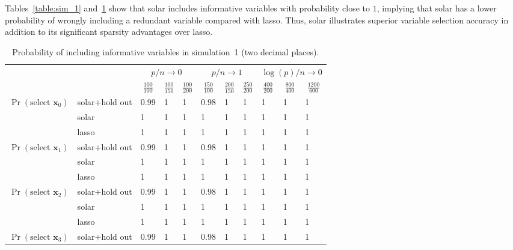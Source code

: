 \documentclass[12pt]{article}
\begin{document}
Tables~\ref{table:sim_1} and~\ref{table:sim_1_info} show that solar includes informative variables with probability close to $1$, implying that solar has a lower probability of wrongly including a redundant variable compared with lasso. Thus, solar illustrates superior variable selection accuracy in addition to its significant sparsity advantages over lasso.

\begin{table}[h]
  \centering
  \small
  \caption{Probability of including informative variables in simulation~1 (two decimal places).}
  \label{table:sim_1_info}
  \renewcommand{\arraystretch}{0.7}
  \begin{tabular}{lllllllllll}
    \toprule
         &
         & \multicolumn{3}{c}{$p/n\rightarrow0$}
         & \multicolumn{3}{c}{$p/n\rightarrow1$}
         & \multicolumn{3}{c}{$\log(p)/n\rightarrow0$} \\
    \cmidrule(r){3-5}\cmidrule(r){6-8}\cmidrule(l){9-11}
      &                           & \multicolumn{1}{c}{$\frac{100}{100}$} & \multicolumn{1}{c}{$\frac{100}{150}$} & \multicolumn{1}{c}{$\frac{100}{200}$} & \multicolumn{1}{c}{$\frac{150}{100}$} & \multicolumn{1}{c}{$\frac{200}{150}$} & \multicolumn{1}{c}{$\frac{250}{200}$} & \multicolumn{1}{c}{$\frac{400}{200}$} & \multicolumn{1}{c}{$\frac{800}{400}$} & \multicolumn{1}{c}{$\frac{1200}{600}$}  \\
    \midrule
    $\Pr(\mbox{select }\mathbf{x}_0)$
    & solar+hold out & 0.99 & 1 & 1 & 0.98 & 1 & 1 & 1 & 1 & 1 \\
    & solar          & 1 & 1 & 1 & 1 & 1 & 1 & 1 & 1 & 1 \\
    & lasso          & 1 & 1 & 1 & 1 & 1 & 1 & 1 & 1 & 1 \\
    $\Pr(\mbox{select }\mathbf{x}_1)$
    & solar+hold out & 0.99 & 1 & 1 & 0.98 & 1 & 1 & 1 & 1 & 1 \\
    & solar          & 1 & 1 & 1 & 1 & 1 & 1 & 1 & 1 & 1 \\
    & lasso          & 1 & 1 & 1 & 1 & 1 & 1 & 1 & 1 & 1 \\
    $\Pr(\mbox{select }\mathbf{x}_2)$
    & solar+hold out & 0.99 & 1 & 1 & 0.98 & 1 & 1 & 1 & 1 & 1 \\
    & solar          & 1 & 1 & 1 & 1 & 1 & 1 & 1 & 1 & 1 \\
    & lasso          & 1 & 1 & 1 & 1 & 1 & 1 & 1 & 1 & 1 \\
    $\Pr(\mbox{select }\mathbf{x}_3)$
    & solar+hold out & 0.99 & 1 & 1 & 0.98 & 1 & 1 & 1 & 1 & 1 \\

\end{tabular}
\end{table}
\end{document}

